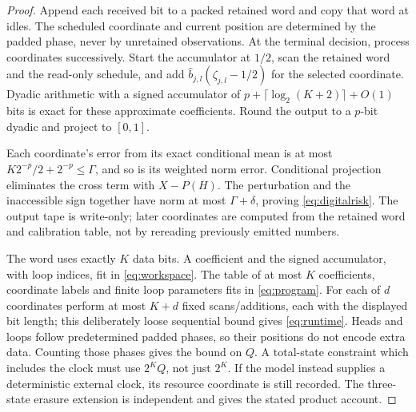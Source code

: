 \begin{proof}
Append each received bit to a packed retained word and copy that word at idles. The scheduled coordinate and current position are determined by the padded phase, never by unretained observations. At the terminal decision, process coordinates successively. Start the accumulator at $1/2$, scan the retained word and the read-only schedule, and add $\widehat b_{j,l}(\zeta_{j,l}-1/2)$ for the selected coordinate. Dyadic arithmetic with a signed accumulator of $p+\lceil\log_2(K+2)\rceil+O(1)$ bits is exact for these approximate coefficients. Round the output to a $p$-bit dyadic and project to $[0,1]$.

Each coordinate's error from its exact conditional mean is at most $K2^{-p}/2+2^{-p}\le\Gamma$, and so is its weighted norm error. Conditional projection eliminates the cross term with $X-P(H)$. The perturbation and the inaccessible sign together have norm at most $\Gamma+\delta$, proving \eqref{eq:digitalrisk}. The output tape is write-only; later coordinates are computed from the retained word and calibration table, not by rereading previously emitted numbers.

The word uses exactly $K$ data bits. A coefficient and the signed accumulator, with loop indices, fit in \eqref{eq:workspace}. The table of at most $K$ coefficients, coordinate labels and finite loop parameters fits in \eqref{eq:program}. For each of $d$ coordinates perform at most $K+d$ fixed scans/additions, each with the displayed bit length; this deliberately loose sequential bound gives \eqref{eq:runtime}. Heads and loops follow predetermined padded phases, so their positions do not encode extra data. Counting those phases gives the bound on $Q$. A total-state constraint which includes the clock must use $2^KQ$, not just $2^K$. If the model instead supplies a deterministic external clock, its resource coordinate is still recorded. The three-state erasure extension is independent and gives the stated product account.
\end{proof}

